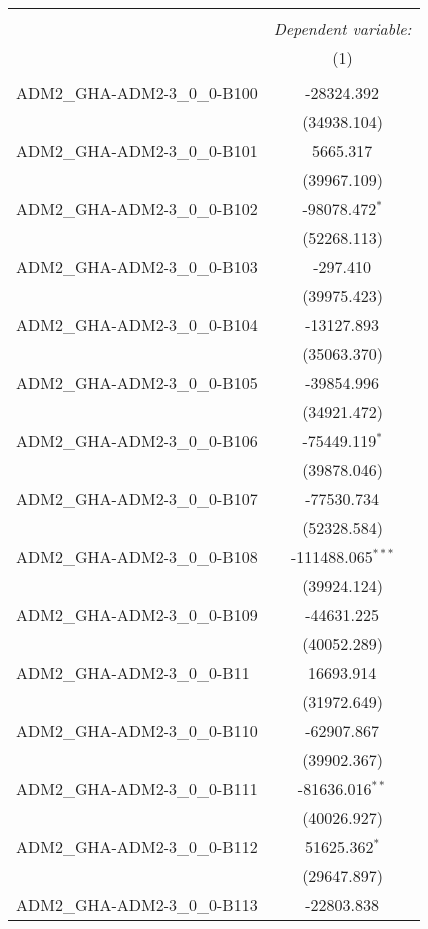 \begin{table}[!htbp] \centering
\begin{tabular}{@{\extracolsep{5pt}}lc}
\\[-1.8ex]\hline
\hline \\[-1.8ex]
& \multicolumn{1}{c}{\textit{Dependent variable:}} \
\cr \cline{1-2}
\\[-1.8ex] & (1) \\
\hline \\[-1.8ex]
 ADM2_GHA-ADM2-3_0_0-B100 & -28324.392$^{}$ \\
  & (34938.104) \\
 ADM2_GHA-ADM2-3_0_0-B101 & 5665.317$^{}$ \\
  & (39967.109) \\
 ADM2_GHA-ADM2-3_0_0-B102 & -98078.472$^{*}$ \\
  & (52268.113) \\
 ADM2_GHA-ADM2-3_0_0-B103 & -297.410$^{}$ \\
  & (39975.423) \\
 ADM2_GHA-ADM2-3_0_0-B104 & -13127.893$^{}$ \\
  & (35063.370) \\
 ADM2_GHA-ADM2-3_0_0-B105 & -39854.996$^{}$ \\
  & (34921.472) \\
 ADM2_GHA-ADM2-3_0_0-B106 & -75449.119$^{*}$ \\
  & (39878.046) \\
 ADM2_GHA-ADM2-3_0_0-B107 & -77530.734$^{}$ \\
  & (52328.584) \\
 ADM2_GHA-ADM2-3_0_0-B108 & -111488.065$^{***}$ \\
  & (39924.124) \\
 ADM2_GHA-ADM2-3_0_0-B109 & -44631.225$^{}$ \\
  & (40052.289) \\
 ADM2_GHA-ADM2-3_0_0-B11 & 16693.914$^{}$ \\
  & (31972.649) \\
 ADM2_GHA-ADM2-3_0_0-B110 & -62907.867$^{}$ \\
  & (39902.367) \\
 ADM2_GHA-ADM2-3_0_0-B111 & -81636.016$^{**}$ \\
  & (40026.927) \\
 ADM2_GHA-ADM2-3_0_0-B112 & 51625.362$^{*}$ \\
  & (29647.897) \\
 ADM2_GHA-ADM2-3_0_0-B113 & -22803.838$^{}$ \\

\end{tabular}
\end{table}
